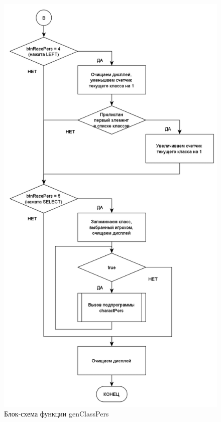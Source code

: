 \documentclass{altsu-report}
\begin{document}
\begin{figure}[H]
    \centering
    \includegraphics[scale=0.8]{genClassPers2.png}
    \caption{Блок-схема функции genClassPers}
    \label{fig:class2}
\end{figure}
\end{document}
